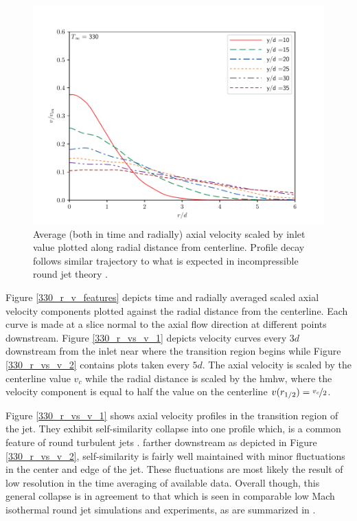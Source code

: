 \begin{figure}[htbp!]
\begin{center}
	\includegraphics[scale=.7]{figures/Plots/radial/slices_5/same_ambient/ur_u_in_vs_r_d.pdf}
	\caption{Average (both in time and radially) axial velocity scaled by inlet value plotted along radial distance from centerline. Profile decay follows similar trajectory to what is expected in incompressible round jet theory \cite{Pope}.} \label{330_centerline_decay}
\end{center}
\end{figure}

Figure \ref{330_r_v_features} depicts time and radially averaged scaled axial velocity components plotted against the radial distance from the centerline. Each curve is made at a slice normal to the axial flow direction at different points downstream. Figure \ref{330_r_vs_v_1} depicts velocity curves every $3d$ downstream from the inlet near where the transition region begins while Figure \ref{330_r_vs_v_2} contains plots taken every $5d$. The axial velocity is scaled by the centerline value $v_c$ while the radial distance is scaled by the \gls{hmhw}, where the velocity component is equal to half the value on the centerline $v(r_{1/2}) = \nicefrac{v_c}{2}$.

Figure \ref{330_r_vs_v_1} shows axial velocity profiles in the transition region of the jet. They exhibit self-similarity collapse into one profile which, is a common feature of round turbulent jets \cite{Pope, iso_comp_1, iso_comp_2}. farther downstream as depicted in Figure \ref{330_r_vs_v_2}, self-similarity is fairly well maintained with minor fluctuations in the center and edge of the jet. These fluctuations are most likely the result of low resolution in the time averaging of available data. Overall though, this general collapse is in agreement to that which is seen in comparable low Mach isothermal round jet simulations and experiments, as are summarized in \cite{iso_comp_1}. 

